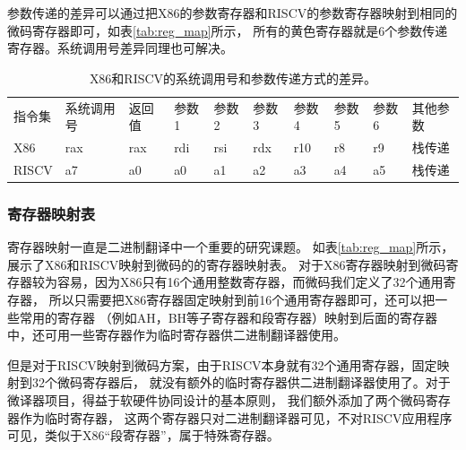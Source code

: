 \documentclass{Style/ucasproposal}%
\begin{document}
参数传递的差异可以通过把X86的参数寄存器和RISCV的参数寄存器映射到相同的微码寄存器即可，如表\ref{tab:reg_map}所示，
所有的黄色寄存器就是6个参数传递寄存器。系统调用号差异同理也可解决。


\begin{table}[]
  \centering
  \caption{
    X86和RISCV的系统调用号和参数传递方式的差异。
  }
  \label{tab:syscall}
  \begin{tabular}{llllllllll}
  \rowcolor[HTML]{FFCC67} 
  \cellcolor[HTML]{FBE5D6}指令集 & \cellcolor[HTML]{FBE5D6}系统调用号 & \cellcolor[HTML]{FBE5D6}返回值 & 参数1 & 参数2 & 参数3 & 参数4 & 参数5 & 参数6 & 其他参数 \\
  X86                         & rax                           & rax                         & rdi & rsi & rdx & r10 & r8  & r9  & 栈传递  \\
  RISCV                       & a7                            & a0                          & a0  & a1  & a2  & a3  & a4  & a5  & 栈传递 
  \end{tabular}
  \end{table}


\subsubsection{寄存器映射表}

寄存器映射一直是二进制翻译中一个重要的研究课题。
如表\ref{tab:reg_map}所示，展示了X86和RISCV映射到微码的的寄存器映射表。
对于X86寄存器映射到微码寄存器较为容易，因为X86只有16个通用整数寄存器，而微码我们定义了32个通用寄存器，
所以只需要把X86寄存器固定映射到前16个通用寄存器即可，还可以把一些常用的寄存器
（例如AH，BH等子寄存器和段寄存器）映射到后面的寄存器中，还可用一些寄存器作为临时寄存器供二进制翻译器使用。

但是对于RISCV映射到微码方案，由于RISCV本身就有32个通用寄存器，固定映射到32个微码寄存器后，
就没有额外的临时寄存器供二进制翻译器使用了。对于微译器项目，得益于软硬件协同设计的基本原则，
我们额外添加了两个微码寄存器作为临时寄存器，
这两个寄存器只对二进制翻译器可见，不对RISCV应用程序可见，类似于X86“段寄存器”，属于特殊寄存器。
\end{document}
